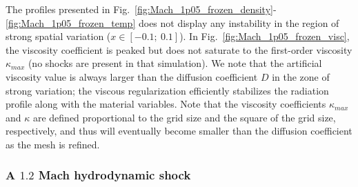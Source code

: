 \documentclass[review]{elsarticle}
\newcommand{\fig}[1]{Fig.~\ref{#1}}                      %
\begin{document}
%
The profiles presented in \fig{fig:Mach_1p05_frozen_density}-\ref{fig:Mach_1p05_frozen_temp} does not display any instability in the region of strong spatial variation
($x \in \left[ -0.1;\  0.1 \right]$). In \fig{fig:Mach_1p05_frozen_visc}, the viscosity coefficient is peaked but does not saturate to the first-order viscosity $\kappa_{max}$ (no shocks are present in that simulation). We note that the artificial viscosity value is always larger than the diffusion coefficient $D$ in the zone of strong variation; the viscous regularization efficiently stabilizes the radiation profile along with the material variables. Note that the viscosity coefficients $\kappa_{max}$ and $\kappa$ are defined proportional to the grid size and the square of the grid size, respectively, and thus will eventually become smaller than the diffusion coefficient as the mesh is refined. 

\subsubsection{A $1.2$ Mach hydrodynamic shock}
\end{document}
